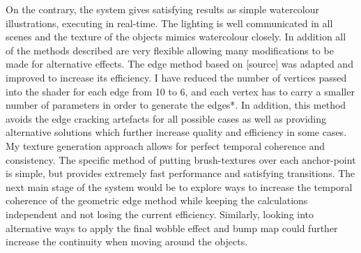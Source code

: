 \documentclass[a4paper, 12pt]{article}
\begin{document}
On the contrary, the system gives satisfying results as simple watercolour illustrations, executing in real-time. The lighting is well communicated in all scenes and the texture of the objects mimics watercolour closely. In addition all of the methods described are very flexible allowing many modifications to be made for alternative effects. The edge method based on [source] was adapted and improved to increase its efficiency. I have reduced the number of vertices passed into the shader for each edge from 10 to 6, and each vertex has to carry a smaller number of parameters in order to generate the edges*. In addition, this method avoids the edge cracking artefacts for all possible cases as well as providing alternative solutions which further increase quality and efficiency in some cases. My texture generation approach allows for perfect temporal coherence and consistency. The specific method of putting brush-textures over each anchor-point is simple, but provides extremely fast performance and satisfying transitions. The next main stage of the system would be to explore ways to increase the temporal coherence of the geometric edge method while keeping the calculations independent and not losing the current efficiency. Similarly, looking into alternative ways to apply the final wobble effect and bump map could further increase the continuity when moving around the objects.
\end{document}
